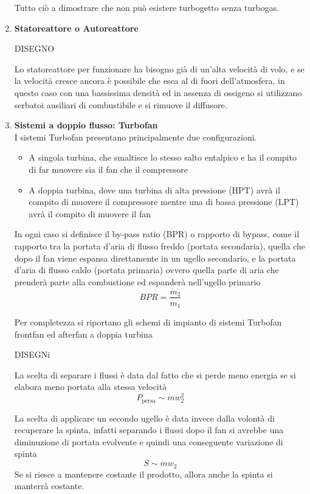 \begin{adjustwidth}{2in}{}
\begin{enumerate}
		Tutto ciò a dimostrare che non può esistere turbogetto senza turbogas.
		
		
		\item \textbf{Statoreattore o Autoreattore}
		
		DISEGNO
		
		Lo statoreattore per funzionare ha bisogno già di un'alta velocità di volo, e se la velocità cresce ancora è possibile che esca al di fuori dell'atmosfera, in questo caso con una bassissima densità ed in assenza di ossigeno si utilizzano serbatoi ausiliari di combustibile e si rimuove il diffusore. 
		
		\item \textbf{Sistemi a doppio flusso: Turbofan}\\
		I sistemi Turbofan presentano principalmente due configurazioni.  		
		\begin{itemize}
			\item A singola turbina, che smaltisce lo stesso salto entalpico e ha il compito di far muovere sia il fan che il compressore
			\item A doppia turbina, dove una turbina di alta pressione (HPT) avrà il compito di muovere il compressore mentre una di bassa pressione (LPT) avrà il compito di muovere il fan
		\end{itemize} 
		In ogni caso si definisce il by-pass ratio (BPR) o rapporto di bypass, come il rapporto tra la portata d'aria di flusso freddo (portata secondaria), quella che dopo il fan viene espansa direttamente in un ugello secondario, e la portata d'aria di flusso caldo (portata primaria) ovvero quella parte di aria che prenderà parte alla combustione ed espanderà nell'ugello primario
		\[BPR = \dfrac{\dot{m}_2}{\dot{m}_1}\]
		
		Per completezza si riportano gli schemi di impianto di sistemi Turbofan frontfan ed afterfan a doppia turbina
		
		DISEGNi
		
		La scelta di separare i flussi è data dal fatto che si perde meno energia se si elabora meno portata alla stessa velocità
		\[P_\text{persa}\sim\dot{m}w_2^2\]
		
		La scelta di applicare un secondo ugello è data invece dalla volontà di recuperare la spinta, infatti separando i flussi dopo il fan si avrebbe una diminuzione di portata evolvente e quindi una conseguente variazione di spinta
		\[S\sim\dot{m}w_2\]
		Se si riesce a mantenere costante il prodotto, allora anche la spinta si manterrà costante.	
	\end{enumerate}		
\end{adjustwidth}



